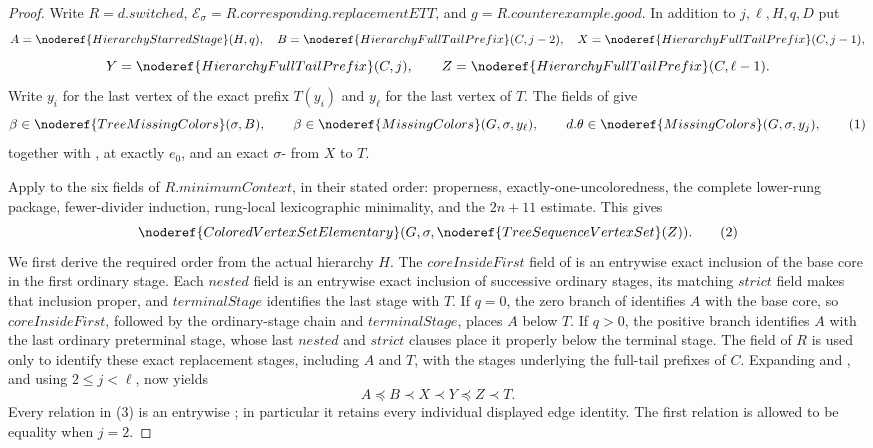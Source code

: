 \begin{proof}
Write $R=d.\mathit{switched}$,
$\mathcal E_\sigma=R.\mathit{corresponding.replacementETT}$, and
$g=R.\mathit{counterexample.good}$.  In addition to $j,\ell,H,q,D$ put
\[
 A=\noderef{HierarchyStarredStage}(H,q),\quad
 B=\noderef{HierarchyFullTailPrefix}(C,j-2),\quad
 X=\noderef{HierarchyFullTailPrefix}(C,j-1),
\]
\[
 Y=\noderef{HierarchyFullTailPrefix}(C,j),\qquad
 Z=\noderef{HierarchyFullTailPrefix}(C,\ell-1).
\]
Write $y_i$ for the last vertex of the exact prefix $T(y_i)$ and
$y_\ell$ for the last vertex of $T$.  The fields of
 give
\[
 \beta\in\noderef{TreeMissingColors}(\sigma,B),\qquad
 \beta\in\noderef{MissingColors}(G,\sigma,y_\ell),\qquad
 d.\theta\in\noderef{MissingColors}(G,\sigma,y_j),             \tag{1}
\]
together with ,
 at exactly $e_0$, and an exact
$\sigma$- from $X$ to $T$.

Apply  to the six
fields of $R.\mathit{minimumContext}$, in their stated order: properness,
exactly-one-uncoloredness, the complete lower-rung package,
fewer-divider induction, rung-local lexicographic minimality, and the
$2n+11$ estimate.  This gives
\[
 \noderef{ColoredVertexSetElementary}
    (G,\sigma,\noderef{TreeSequenceVertexSet}(Z)).              \tag{2}
\]
We first derive the required order from the actual hierarchy $H$.  The
\(\mathit{coreInsideFirst}\) field of  is an
entrywise exact inclusion of the base core in the first ordinary stage.
Each \(\mathit{nested}\) field is an entrywise exact inclusion of
successive ordinary stages, its matching \(\mathit{strict}\) field makes
that inclusion proper, and \(\mathit{terminalStage}\) identifies the last
stage with $T$.  If $q=0$, the zero branch of
 identifies $A$ with the base core, so
\(\mathit{coreInsideFirst}\), followed by the ordinary-stage chain and
\(\mathit{terminalStage}\), places $A$ below $T$.  If $q>0$, the positive
branch identifies $A$ with the last ordinary preterminal stage, whose last
\(\mathit{nested}\) and \(\mathit{strict}\) clauses place it properly below
the terminal stage.  The  field of $R$ is used
only to identify these exact replacement stages, including $A$ and $T$,
with the stages underlying the full-tail prefixes of $C$.  Expanding
 and
, and using $2\le j<\ell$, now yields
\[
             A\preccurlyeq B\prec X\prec Y\preccurlyeq Z\prec T. \tag{3}
\]
Every relation in (3) is an entrywise
; in particular it retains every
individual displayed edge identity.  The first relation is allowed to
be equality when $j=2$.


\end{proof}
